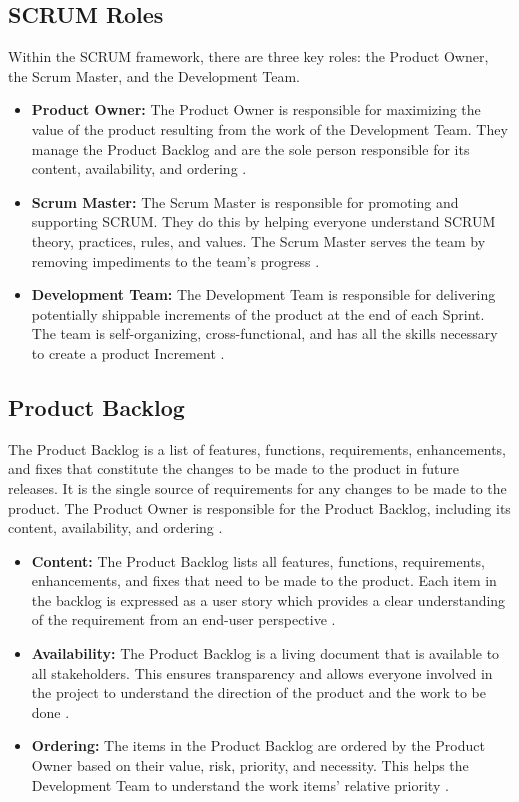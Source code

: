 \subsection{SCRUM Roles}
Within the SCRUM framework, there are three key roles: the Product Owner, the Scrum Master, and the Development Team.

\vspace{10pt}

\begin{itemize}
\item \textbf{Product Owner:} The Product Owner is responsible for maximizing the value of the product resulting from the work of the Development Team. They manage the Product Backlog and are the sole person responsible for its content, availability, and ordering \cite{scrum}.

\item \textbf{Scrum Master:} The Scrum Master is responsible for promoting and supporting SCRUM. They do this by helping everyone understand SCRUM theory, practices, rules, and values. The Scrum Master serves the team by removing impediments to the team's progress \cite{scrum}.

\item \textbf{Development Team:} The Development Team is responsible for delivering potentially shippable increments of the product at the end of each Sprint. The team is self-organizing, cross-functional, and has all the skills necessary to create a product Increment \cite{scrum}.
\end{itemize}

\subsection{Product Backlog}
The Product Backlog is a list of features, functions, requirements, enhancements, and fixes that constitute the changes to be made to the product in future releases. It is the single source of requirements for any changes to be made to the product. The Product Owner is responsible for the Product Backlog, including its content, availability, and ordering \cite{scrum}.

\vspace{10pt}

\begin{itemize}
\item \textbf{Content:} The Product Backlog lists all features, functions, requirements, enhancements, and fixes that need to be made to the product. Each item in the backlog is expressed as a user story which provides a clear understanding of the requirement from an end-user perspective \cite{scrum}.
\item \textbf{Availability:} The Product Backlog is a living document that is available to all stakeholders. This ensures transparency and allows everyone involved in the project to understand the direction of the product and the work to be done \cite{scrum}.
\item \textbf{Ordering:} The items in the Product Backlog are ordered by the Product Owner based on their value, risk, priority, and necessity. This helps the Development Team to understand the work items' relative priority \cite{scrum}.
\end{itemize}


